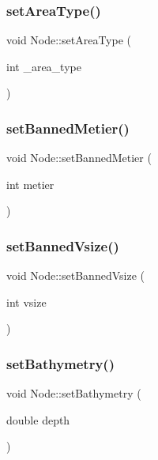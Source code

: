\mbox{\label{class_node_a6cc325f90a8419a45a43d2bdcb939d2a}} 
\subsubsection{\texorpdfstring{setAreaType()}{setAreaType()}}
{\footnotesize\ttfamily void Node\+::set\+Area\+Type (\begin{DoxyParamCaption}\item[{int}]{\+\_\+area\+\_\+type }\end{DoxyParamCaption})}

\mbox{\label{class_node_ac216385365b6eef9ee9c93a0ef727901}} 
\subsubsection{\texorpdfstring{setBannedMetier()}{setBannedMetier()}}
{\footnotesize\ttfamily void Node\+::set\+Banned\+Metier (\begin{DoxyParamCaption}\item[{int}]{metier }\end{DoxyParamCaption})\hspace{0.3cm}{\ttfamily [inline]}}

\mbox{\label{class_node_a448a5baf8c5f91cef737214e9c06257f}} 
\subsubsection{\texorpdfstring{setBannedVsize()}{setBannedVsize()}}
{\footnotesize\ttfamily void Node\+::set\+Banned\+Vsize (\begin{DoxyParamCaption}\item[{int}]{vsize }\end{DoxyParamCaption})\hspace{0.3cm}{\ttfamily [inline]}}

\mbox{\label{class_node_a1cce5e8b3b596723d57b448da6209df8}} 
\subsubsection{\texorpdfstring{setBathymetry()}{setBathymetry()}}
{\footnotesize\ttfamily void Node\+::set\+Bathymetry (\begin{DoxyParamCaption}\item[{double}]{depth }\end{DoxyParamCaption})\hspace{0.3cm}{\ttfamily [inline]}}

